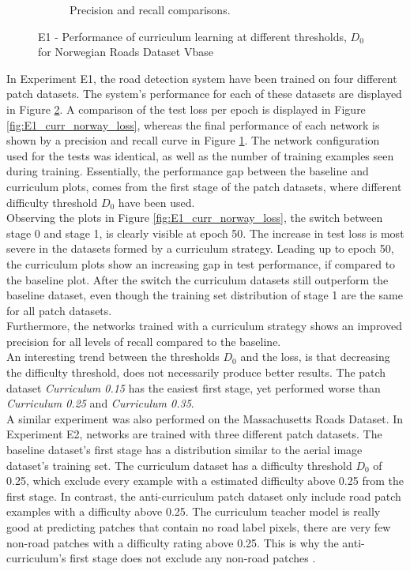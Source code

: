 \begin{figure}[!ht]
\begin{subfigure}{0.48\textwidth}
\caption{Precision and recall comparisons.} \label{fig:E1_curr_norway_pr}
\end{subfigure}
\hspace*{\fill} %
\caption{E1 - Performance of curriculum learning at different thresholds, $D_{0}$ for Norwegian Roads Dataset Vbase} \label{fig:E1_curriculum_norway}
\end{figure}

In Experiment E1, the road detection system have been trained on four different patch datasets. The system's performance for each of these datasets are displayed in Figure \ref{fig:E1_curriculum_norway}. A comparison of the test loss per epoch is displayed in Figure \ref{fig:E1_curr_norway_loss}, whereas the final performance of each network is shown by a precision and recall curve in Figure \ref{fig:E1_curr_norway_pr}. The network configuration used for the tests was identical, as well as the number of training examples seen during training. Essentially, the performance gap between the baseline and curriculum plots, comes from the first stage of the patch datasets, where different difficulty threshold $D_0$ have been used.\\

Observing the plots in Figure \ref{fig:E1_curr_norway_loss}, the switch between stage 0 and stage 1, is clearly visible at epoch 50. The increase in test loss is most severe in the datasets formed by a curriculum strategy. Leading up to epoch 50, the curriculum plots show an increasing gap in test performance, if compared to the baseline plot. After the switch the curriculum datasets still outperform the baseline dataset, even though the training set distribution of stage 1 are the same for all patch datasets.\\

Furthermore, the networks trained with a curriculum strategy shows an improved precision for all levels of recall compared to the baseline.\\

An interesting trend between the thresholds $D_0$ and the loss, is that decreasing the difficulty threshold, does not necessarily produce better results. The patch dataset \textit{Curriculum 0.15} has the easiest first stage, yet performed worse than \textit{Curriculum 0.25} and \textit{Curriculum 0.35}. \\

A similar experiment was also performed on the Massachusetts Roads Dataset. In Experiment E2, networks are trained with three different patch datasets. The baseline dataset's first stage has a distribution similar to the aerial image dataset's training set. The curriculum dataset has a difficulty threshold $D_0$ of 0.25, which exclude every example with a estimated difficulty above 0.25 from the first stage. In contrast, the anti-curriculum patch dataset only include road patch examples with a difficulty above 0.25. The curriculum teacher model is really good at predicting patches that contain no road label pixels, there are very few non-road patches with a difficulty rating above 0.25. This is why the anti-curriculum's first stage does not exclude any non-road patches . 


